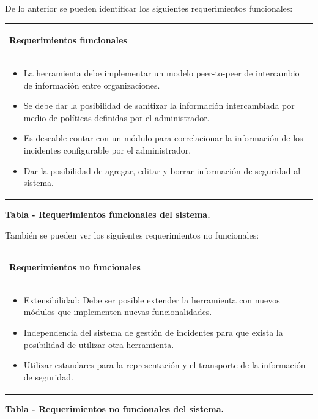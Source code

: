 \bigskip
\newpage
	De lo anterior se pueden identificar los siguientes requerimientos funcionales:
\begin{flushleft}
	\tablefirsthead{}
	\tablehead{}
	\tabletail{}
	\tablelasttail{}
	\begin{supertabular}{|m{5.83516in}|}
		\hline
		\begin{center}{\bfseries Requerimientos funcionales}
		\end{center}
		\\\hline
		\begin{itemize}
			\item {La herramienta debe implementar un modelo peer-to-peer de intercambio de
				información entre organizaciones.}
			\item {Se debe dar la posibilidad de sanitizar la información intercambiada por medio
				de políticas definidas por el administrador.}
			\item {Es deseable contar con un módulo para correlacionar la información de los
				incidentes configurable por el administrador.}
			\item {Dar la posibilidad de agregar, editar y borrar información de seguridad al sistema.}
		\end{itemize}
		\\\hline
	\end{supertabular}
\end{flushleft}
{\centering{}\bfseries
	\foreignlanguage{spanish}{Tabla }\foreignlanguage{spanish}{ - Requerimientos funcionales
		del sistema.}
	\par}
\bigskip
	También se pueden ver los siguientes requerimientos no funcionales:

\begin{flushleft}
	\tablefirsthead{}
	\tablehead{}
	\tabletail{}
	\tablelasttail{}
	\begin{supertabular}{|m{5.83516in}|}
		\hline
		\begin{center}{\bfseries Requerimientos no funcionales}
		\end{center}
		\\\hline
		\begin{itemize}
			\item {Extensibilidad: Debe ser posible extender la herramienta con nuevos módulos que
				implementen nuevas funcionalidades.}
			\item {Independencia del sistema de gestión de incidentes para que exista la posibilidad de
				utilizar otra herramienta.}
			\item {Utilizar estandares para la representación y el transporte de la información de seguridad.}
		\end{itemize}
		\\\hline
	\end{supertabular}
\end{flushleft}
{\centering{}\bfseries
	\foreignlanguage{spanish}{Tabla }\foreignlanguage{spanish}{ - Requerimientos no
		funcionales del sistema.}
	\par}


